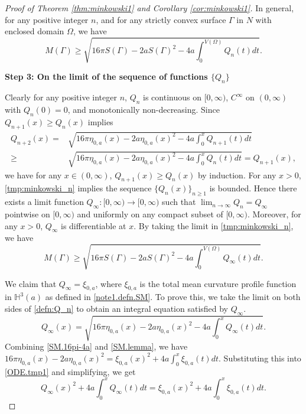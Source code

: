 \documentclass[11pt]{amsart}
\theoremstyle{definition}
\newcommand{\HH}{\mathbb{H}}
\theoremstyle{remark}
\numberwithin{equation}{section}
\begin{document}
\begin{proof}[Proof of Theorem \ref{thm:minkowski1} and Corollary \ref{cor:minkowski1}]
	
	In general, for any positive integer $n$, and for any strictly convex surface $\Gamma$ in $N$ with enclosed domain $\Omega$, we have
	\begin{equation}\label{tmp:minkowski_n}
		M(\Gamma) \geq \sqrt{16 \pi S(\Gamma) - 2a S(\Gamma)^2 - 4a \int_{0}^{V(\Omega)} Q_n(t)dt }.
	\end{equation}
	
	\textbf{Step 3: On the limit of the sequence of functions $\{Q_n\}$}
	
	Clearly for any positive integer $n$, $Q_n$ is continuous on $[0,\infty)$, $C^{\infty}$ on $(0,\infty)$ with $Q_n(0)=0$, and monotonically non-decreasing.
	Since $Q_{n+1}(x) \geq Q_{n}(x)$ implies
	\begin{align*}
		Q_{n+2}(x) = &\sqrt{16 \pi \eta_{0,a}(x) - 2a \eta_{0,a}(x)^2 - 4a \int_{0}^{x} Q_{n+1}(t)dt} \\
		\geq 
		&\sqrt{16 \pi \eta_{0,a}(x) - 2a \eta_{0,a}(x)^2 - 4a \int_{0}^{x} Q_{n}(t)dt} = Q_{n+1}(x),
	\end{align*}
	we have for any $x\in (0,\infty)$, $ Q_{n+1}(x) \geq Q_{n}(x) $ by induction.
	For any $x>0$, \eqref{tmp:minkowski_n} implies the sequence $\{Q_{n}(x)\}_{n\geq 1}$ is bounded. Hence there exists a limit function $Q_{\infty}: [0,\infty) \rightarrow [0,\infty)$ such that $\lim_{n \rightarrow \infty} Q_n = Q_{\infty}$ pointwise on $[0,\infty)$ and uniformly on any compact subset of $[0,\infty)$. Moreover, for any $x>0$, $Q_{\infty}$ is differentiable at $x$. By taking the limit in \eqref{tmp:minkowski_n}, we have
	\begin{equation}\label{tmp:minkowski_infty}
		M(\Gamma) \geq \sqrt{16 \pi S(\Gamma) - 2a S(\Gamma)^2 - 4a \int_{0}^{V(\Omega)} Q_{\infty}(t)dt }.
	\end{equation}
	
	We claim that $Q_{\infty} = \xi_{0,a}$, where $\xi_{0,a}$ is the total mean curvature profile function in $\HH^3(a)$ as defined in \eqref{note1.defn.SM}. To prove this, we  take the limit on both sides of \eqref{defn:Q_n} to obtain an integral equation satisfied by $Q_{\infty}$.
	\begin{equation}\label{ODE.tmp1}
		Q_{\infty}(x) = \sqrt{16 \pi \eta_{0,a}(x) - 2a \eta_{0,a}(x)^2 - 4a \int_{0}^{x} Q_{\infty}(t)dt }.
	\end{equation}
	Combining \eqref{SM.16pi-4a} and \eqref{SM.lemma}, we have
	$16 \pi \eta_{0,a}(x) - 2a \eta_{0,a}(x)^2 = \xi_{0,a}(x)^2 + 4a \int_{0}^{x} \xi_{0,a}(t)dt  $. Substituting this into \eqref{ODE.tmp1} and simplifying, we get 
	\begin{equation}\label{ODE.tmp2}
		Q_{\infty}(x)^2 + 4a \int_{0}^{x} Q_{\infty}(t)dt
		=
		\xi_{0,a}(x)^2 + 4a \int_{0}^{x} \xi_{0,a}(t) dt.
	\end{equation}
	

\end{proof}
\end{document}
